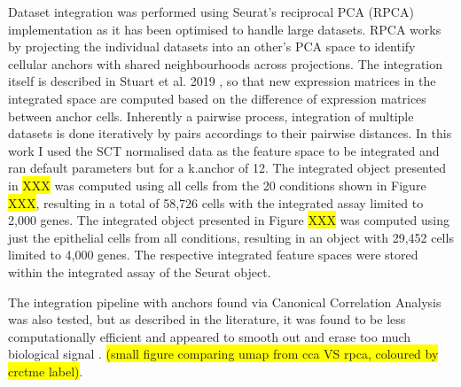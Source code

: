 Dataset integration was performed using Seurat's reciprocal PCA (RPCA) implementation \cite{hao_integrated_2021} as it has been optimised to handle large datasets. RPCA works by projecting the individual datasets into an other's PCA space to identify cellular anchors with shared neighbourhoods across projections. The integration itself is described in Stuart et al. 2019 \cite{stuart_integrative_2019}, so that new expression matrices in the integrated space are computed based on the difference of expression matrices between anchor cells. Inherently a pairwise process, integration of multiple datasets is done iteratively by pairs accordings to their pairwise distances. In this work I used the SCT normalised data as the feature space to be integrated and ran default parameters but for a k.anchor of 12.
The integrated object presented in \colorbox{yellow}{XXX} was computed using all cells from the 20 conditions shown in Figure \colorbox{yellow}{XXX}, resulting in a total of 58,726 cells with the integrated assay limited to 2,000 genes. The integrated object presented in Figure \colorbox{yellow}{XXX} was computed using just the epithelial cells from all conditions, resulting in an object with 29,452 cells limited to 4,000 genes. The respective integrated feature spaces were stored within the integrated assay of the Seurat object.

The integration pipeline with anchors found via Canonical Correlation Analysis was also tested, but as described in the literature, it was found to be less computationally efficient and appeared to smooth out and erase too much biological signal \cite{stuart_integrative_2019}. \colorbox{yellow}{(small figure comparing umap from cca VS rpca, coloured by crctme label)}.

